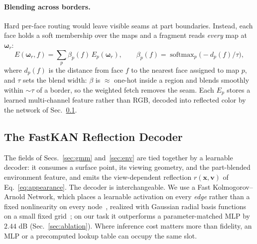 \paragraph{Blending across borders.}
Hard per-face routing would leave visible seams at part boundaries. Instead, each face holds a soft
membership over the maps and a fragment reads \emph{every} map at $\boldsymbol{\omega}_r$:
%
\begin{equation}
E(\boldsymbol{\omega}_r, f) = \sum_{p} \beta_p(f)\, E_p(\boldsymbol{\omega}_r),
\qquad
\beta_p(f) = \operatorname{softmax}_p\!\big(-d_p(f)/\tau\big),
\label{eq:envblend}
\end{equation}
%
where $d_p(f)$ is the distance from face $f$ to the nearest face assigned to map $p$, and $\tau$
sets the blend width: $\beta$ is $\approx$ one-hot inside a region and blends smoothly within
$\sim\tau$ of a border, so the weighted fetch removes the seam.  Each $E_p$ stores a learned
multi-channel feature rather than RGB, decoded into reflected color by the network of
Sec.~\ref{sec:kan}.

\subsection{The FastKAN Reflection Decoder}
\label{sec:kan}
The fields of Secs.~\ref{sec:gmm} and~\ref{sec:env} are tied together by a learnable decoder: it
consumes a surface point, its viewing geometry, and the part-blended environment feature, and emits
the view-dependent reflection $r(\mathbf{x},\mathbf{v})$ of Eq.~\eqref{eq:appearance}. The decoder
is interchangeable. We use a Fast Kolmogorov--Arnold Network, which places a learnable activation on
every \emph{edge} rather than a fixed nonlinearity on every node~\citep{kan}, realized with Gaussian
radial basis functions on a small fixed grid~\citep{fastkan}; on our task it outperforms a
parameter-matched MLP by $2.44$ dB (Sec.~\ref{sec:ablation}).
 Where inference cost matters more than
fidelity, an MLP or a precomputed lookup table can occupy the same slot.

